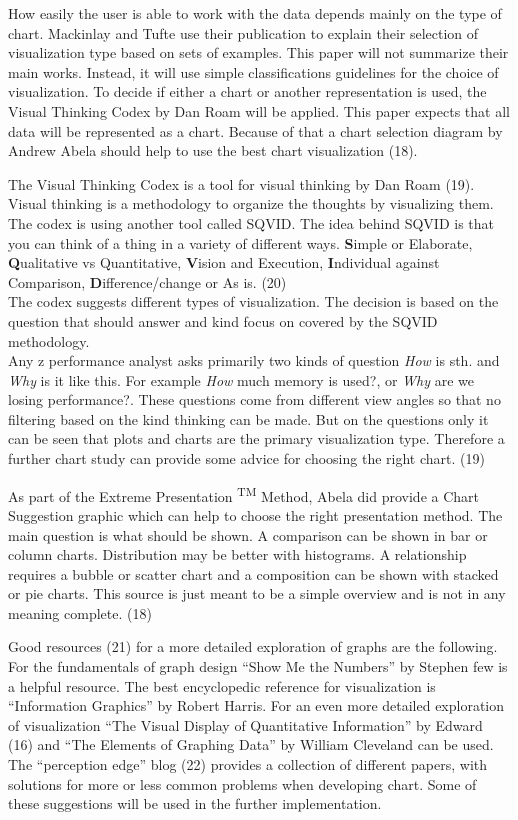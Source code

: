 \documentclass[american,a4paper,oneside,,tablecaptionabove]{scrbook}
\begin{document}
How easily the user is able to work with the data depends mainly on the
type of chart. Mackinlay and Tufte use their publication to explain
their selection of visualization type based on sets of examples. This
paper will not summarize their main works. Instead, it will use simple
classifications guidelines for the choice of visualization. To decide if
either a chart or another representation is used, the Visual Thinking
Codex by Dan Roam will be applied. This paper expects that all data will
be represented as a chart. Because of that a chart selection diagram by
Andrew Abela should help to use the best chart visualization (18).

The Visual Thinking Codex is a tool for visual thinking by Dan Roam
(19). Visual thinking is a methodology to organize the thoughts by
visualizing them. The codex is using another tool called SQVID. The idea
behind SQVID is that you can think of a thing in a variety of different
ways. \textbf{S}imple or Elaborate, \textbf{Q}ualitative vs
Quantitative, \textbf{V}ision and Execution, \textbf{I}ndividual against
Comparison, \textbf{D}ifference/change or As is. (20)\\
The codex suggests different types of visualization. The decision is
based on the question that should answer and kind focus on covered by
the SQVID methodology.\\
Any z performance analyst asks primarily two kinds of question
\emph{How} is sth. and \emph{Why} is it like this. For example
\emph{How} much memory is used?, or \emph{Why} are we losing
performance?. These questions come from different view angles so that no
filtering based on the kind thinking can be made. But on the questions
only it can be seen that plots and charts are the primary visualization
type. Therefore a further chart study can provide some advice for
choosing the right chart. (19)

As part of the Extreme Presentation \textsuperscript{TM} Method, Abela
did provide a Chart Suggestion graphic which can help to choose the
right presentation method. The main question is what should be shown. A
comparison can be shown in bar or column charts. Distribution may be
better with histograms. A relationship requires a bubble or scatter
chart and a composition can be shown with stacked or pie charts. This
source is just meant to be a simple overview and is not in any meaning
complete. (18)

Good resources (21) for a more detailed exploration of graphs are the
following. For the fundamentals of graph design \enquote{Show Me the
Numbers} by Stephen few is a helpful resource. The best encyclopedic
reference for visualization is \enquote{Information Graphics} by Robert
Harris. For an even more detailed exploration of visualization
\enquote{The Visual Display of Quantitative Information} by Edward (16)
and \enquote{The Elements of Graphing Data} by William Cleveland can be
used.\\
The \enquote{perception edge} blog (22) provides a collection of
different papers, with solutions for more or less common problems when
developing chart. Some of these suggestions will be used in the further
implementation.
\end{document}

